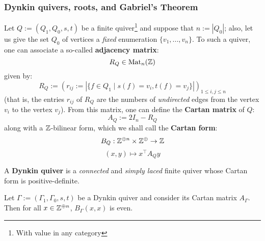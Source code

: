         \subsubsection{Dynkin quivers, roots, and Gabriel's Theorem}
            \begin{definition} \label{def: adjacency_and_cartan_matrices}
                Let $Q := (Q_1, Q_0, s, t)$ be a finite quiver\footnote{With value in any category} and suppose that $n := |Q_0|$; also, let us give the set $Q_0$ of vertices a \textit{fixed} enumeration $\{v_1, ..., v_n\}$. To such a quiver, one can associate a so-called \textbf{adjacency matrix}:
                    $$R_Q \in \mathrm{Mat}_n(\mathbb{Z})$$
                given by:
                    $$R_Q := (r_{ij} := |\{f \in Q_1 \mid s(f) = v_i, t(f) = v_j\}|)_{1 \leq i, j \leq n}$$
                (that is, the entries $r_{ij}$ of $R_Q$ are the numbers of \textit{undirected} edges from the vertex $v_i$ to the vertex $v_j$). From this matrix, one can define the \textbf{Cartan matrix} of $Q$:
                    $$A_Q := 2I_n - R_Q$$
                along with a $\mathbb{Z}$-bilinear form, which we shall call the \textbf{Cartan form}:
                    $$B_Q: \Z^{\oplus n} \x \Z^{\oplus} \to \Z$$
                    $$(x, y) \mapsto x^{\top} A_Q y$$                
            \end{definition}
            \begin{definition} \label{def: dynkin_quivers}
                A \textbf{Dynkin quiver} is a \textit{connected} and \textit{simply laced} finite quiver whose Cartan form is positive-definite.
            \end{definition}
            \begin{proposition}
                Let $\Gamma := (\Gamma_1, \Gamma_0, s, t)$ be a Dynkin quiver and consider its Cartan matrix $A_{\Gamma}$. Then for all $x \in \mathbb{Z}^{\oplus n}$, $B_{\Gamma}(x, x)$ is even.  
            \end{proposition}
